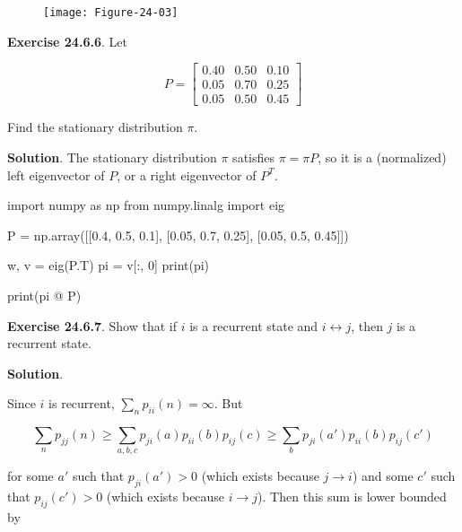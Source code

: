\begin{figure}[H]
\texttt{[image: Figure-24-03]}
\end{figure}

\textbf{Exercise 24.6.6}. Let

\[ P = \begin{bmatrix}
0.40 & 0.50 & 0.10 \\
0.05 & 0.70 & 0.25 \\
0.05 & 0.50 & 0.45
\end{bmatrix}\]

Find the stationary distribution \(\pi\).

\textbf{Solution}. The stationary distribution \(\pi\) satisfies
\(\pi = \pi P\), so it is a (normalized) left eigenvector of \(P\), or a
right eigenvector of \(P^T\).

\begin{python}
import numpy as np
from numpy.linalg import eig

P = np.array([[0.4, 0.5, 0.1], [0.05, 0.7, 0.25], [0.05, 0.5, 0.45]])
\end{python}

\begin{python}
w, v = eig(P.T)
pi = v[:, 0]
print(pi)
\end{python}

\begin{console}
[0.11041049 0.89708523 0.42784065]
\end{console}

\begin{python}
print(pi @ P)
\end{python}

\begin{console}
[0.11041049 0.89708523 0.42784065]
\end{console}

\textbf{Exercise 24.6.7}. Show that if \(i\) is a recurrent state and
\(i \leftrightarrow j\), then \(j\) is a recurrent state.

\textbf{Solution}.

Since \(i\) is recurrent, \(\sum_n p_{ii}(n) = \infty\). But

\[\sum_n p_{jj}(n) \geq \sum_{a, b, c} p_{ji}(a) p_{ii}(b) p_{ij}(c) \geq \sum_b p_{ji}(a') p_{ii}(b) p_{ij}(c')\]

for some \(a'\) such that \(p_{ji}(a') > 0\) (which exists because
\(j \rightarrow i\)) and some \(c'\) such that \(p_{ij}(c') > 0\) (which
exists because \(i \rightarrow j\)). Then this sum is lower bounded by

